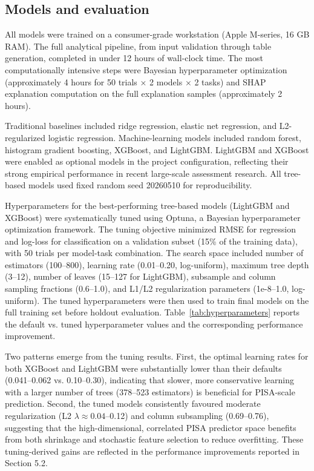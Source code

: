 \documentclass[pdflatex,sn-mathphys-ay]{sn-jnl}
\begin{document}


\FloatBarrier
\subsection{Models and evaluation}

All models were trained on a consumer-grade workstation (Apple M-series, 16 GB RAM). The full analytical pipeline, from input validation through table generation, completed in under 12 hours of wall-clock time. The most computationally intensive steps were Bayesian hyperparameter optimization (approximately 4 hours for 50 trials × 2 models × 2 tasks) and SHAP explanation computation on the full explanation samples (approximately 2 hours).

Traditional baselines included ridge regression, elastic net regression, and L2-regularized logistic regression. Machine-learning models included random forest, histogram gradient boosting, XGBoost, and LightGBM. LightGBM and XGBoost were enabled as optional models in the project configuration, reflecting their strong empirical performance in recent large-scale assessment research. All tree-based models used fixed random seed 20260510 for reproducibility.

Hyperparameters for the best-performing tree-based models (LightGBM and XGBoost) were systematically tuned using Optuna, a Bayesian hyperparameter optimization framework. The tuning objective minimized RMSE for regression and log-loss for classification on a validation subset (15\% of the training data), with 50 trials per model-task combination. The search space included number of estimators (100–800), learning rate (0.01–0.20, log-uniform), maximum tree depth (3–12), number of leaves (15–127 for LightGBM), subsample and column sampling fractions (0.6–1.0), and L1/L2 regularization parameters (1e-8–1.0, log-uniform). The tuned hyperparameters were then used to train final models on the full training set before holdout evaluation. Table~\ref{tab:hyperparameters} reports the default vs. tuned hyperparameter values and the corresponding performance improvement.



Two patterns emerge from the tuning results. First, the optimal learning rates for both XGBoost and LightGBM were substantially lower than their defaults (0.041--0.062 vs. 0.10--0.30), indicating that slower, more conservative learning with a larger number of trees (378--523 estimators) is beneficial for PISA-scale prediction. Second, the tuned models consistently favoured moderate regularization (L2 $\lambda \approx 0.04$--0.12) and column subsampling (0.69--0.76), suggesting that the high-dimensional, correlated PISA predictor space benefits from both shrinkage and stochastic feature selection to reduce overfitting. These tuning-derived gains are reflected in the performance improvements reported in Section 5.2.
\end{document}

